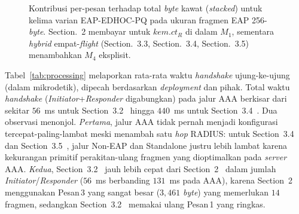 \documentclass{easychair}
\newcommand{\VarSec}[1]{Section~#1~\cite{pq-edhoc-draft}}
\newcommand{\VarSecShort}[1]{Section.~#1}
\begin{document}
\begin{figure}[H]
\centering
{}
\caption{Kontribusi per-pesan terhadap total \emph{byte} kawat
(\emph{stacked}) untuk kelima varian EAP-EDHOC-PQ pada ukuran fragmen
EAP 256-\emph{byte}. \VarSecShort{2} membayar untuk
$\mathit{kem.ct}_R$ di dalam $M_1$, sementara \emph{hybrid} empat-\emph{flight}
(\VarSecShort{3.3}, \VarSecShort{3.4}, \VarSecShort{3.5}) menambahkan
$M_4$ eksplisit.}
\label{fig:wire-stacked}
\end{figure}
\FloatBarrier
Tabel~\ref{tab:processing} melaporkan rata-rata waktu \emph{handshake}
ujung-ke-ujung (dalam mikrodetik), dipecah berdasarkan \emph{deployment}
dan pihak. Total waktu \emph{handshake} (\emph{Initiator}+\emph{Responder}
digabungkan) pada jalur AAA berkisar dari sekitar $56$~ms untuk
\VarSec{3.2} hingga $440$~ms untuk \VarSec{3.4}. Dua observasi
menonjol. \emph{Pertama}, jalur AAA tidak pernah menjadi konfigurasi
tercepat-paling-lambat meski menambah satu \emph{hop} RADIUS: untuk
\VarSec{3.4} dan \VarSec{3.5}, jalur Non-EAP dan Standalone justru
lebih lambat karena kekurangan primitif perakitan-ulang fragmen yang
dioptimalkan pada \emph{server} AAA. \emph{Kedua}, \VarSec{3.2}
jauh lebih cepat dari \VarSec{2} dalam jumlah \emph{Initiator}/\emph{Responder}
($56$~ms berbanding $131$~ms pada AAA), karena \VarSec{2} menggunakan
Pesan\,3 yang sangat besar ($3{,}461$ \emph{byte}) yang memerlukan
$14$ fragmen, sedangkan \VarSec{3.2} memakai ulang Pesan\,1 yang
ringkas.
\end{document}

